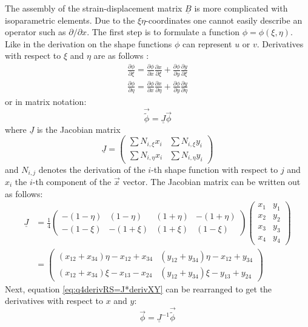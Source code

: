   The assembly of the strain-displacement matrix $\underline{B}$ is more complicated with isoparametric elements. Due to the $\xi\eta$-coordinates one cannot easily describe an operator such as $\partial/\partial x$. The first step is to formulate a function $\phi = \phi(\xi,\eta)$. Like in the derivation on the shape functions $\phi$ can represent $u$ or $v$. Derivatives with respect to $\xi$ and $\eta$ are as follows \cite{cook2002concepts}:
  \begin{align}
  \frac{\partial \phi}{\partial \xi} = \frac{\partial \phi}{\partial x} \frac{\partial x}{\partial \xi} + \frac{\partial \phi}{\partial y} \frac{\partial y}{\partial \xi} \nonumber\\
  \frac{\partial \phi}{\partial \eta} = \frac{\partial \phi}{\partial x} \frac{\partial x}{\partial \eta} + \frac{\partial \phi}{\partial y} \frac{\partial y}{\partial \eta}
  \end{align}
  or in matrix notation:
  \begin{equation}\label{eq:q4derivRS=J*derivXY}
  \vec{\tilde{\phi}} = \underline{J} \vec{\phi}
  \end{equation}
  where $\underline{J}$ is the Jacobian matrix
  \begin{equation}
  \underline{J} = \begin{pmatrix}
  \sum N_{i,\xi}x_i & \sum N_{i,\xi}y_i\\
  \sum N_{i,\eta}x_i & \sum N_{i,\eta}y_i
  \end{pmatrix}
  \end{equation}
  and $N_{i,j}$ denotes the derivation of the $i$-th shape function with respect to $j$ and $x_i$ the $i$-th component of the $\vec{x}$ vector. The Jacobian matrix can be written out as follows:
  \begin{align}
  \underline{J} &= \frac{1}{4}\begin{pmatrix}
  -(1-\eta) & (1-\eta) & (1+\eta) & -(1+\eta)\\
  -(1-\xi) & -(1+\xi) & (1+\xi) & (1-\xi)
  \end{pmatrix} \begin{pmatrix}
  x_1 & y_1\\
  x_2 & y_2\\
  x_3 & y_3\\
  x_4 & y_4
  \end{pmatrix} \nonumber\\
  &= \begin{pmatrix}
  (x_{12}+x_{34})\eta - x_{12} + x_{34} & (y_{12} + y_{34})\eta - x_{12} + y_{34}\\
  (x_{12}+x_{34})\xi  - x_{13} - x_{24} & (y_{12} + y_{34})\xi  - y_{13} + y_{24}
  \end{pmatrix}
  \end{align}
  Next, equation \eqref{eq:q4derivRS=J*derivXY} can be rearranged to get the derivatives with respect to $x$ and $y$:
  \begin{equation}
  \vec{\phi} = \underline{J}^{-1}\vec{\tilde{\phi}}
  \end{equation}
  
